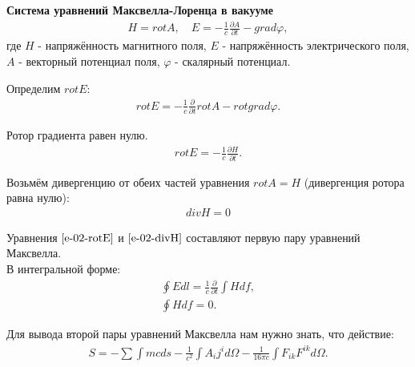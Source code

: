 \documentclass[__main__.tex]{subfiles}
\begin{document}
\textbf{Система уравнений Максвелла-Лоренца в вакууме}\\

\begin{gather*}
	H = rot A, \quad E = -\frac{1}{c}\frac{\partial A}{\partial t} - grad \varphi,
\end{gather*}
где $H$ - напряжённость магнитного поля, $E$ - напряжённость электрического поля,
$A$ - векторный потенциал поля,
$\varphi$ - скалярный потенциал.

Определим $rot E$:
\begin{gather*}
	rot E = -\frac{1}{c}\frac{\partial}{\partial t}rot A - rot grad \varphi.
\end{gather*}

Ротор градиента равен нулю.
\begin{gather}
	\label{e-02-rotE}
	rot E = -\frac{1}{c}\frac{\partial H}{\partial t}.
\end{gather}

Возьмём дивергенцию от обеих частей уравнения $rot A = H$ (дивергенция ротора равна нулю):
\begin{gather}
	\label{e-02-divH}
	div H = 0
\end{gather}

Уравнения $\ref{e-02-rotE}$ и  $\ref{e-02-divH}$ составляют первую пару уравнений Максвелла.\\
В интегральной форме:\\
\begin{gather*}
	\oint Edl = \frac{1}{c}\frac{\partial}{\partial t}\int Hdf,\\
	\oint H df = 0.
\end{gather*}

Для вывода второй пары уравнений Максвелла нам нужно знать, что действие:
\begin{gather}
	\label{e-02-S}
	S = -\sum\int mcds - \frac{1}{c^2}\int A_ij^id\Omega - \frac{1}{16\pi c}\int F_{ik}F^{ik}d\Omega.
\end{gather}
\end{document}
